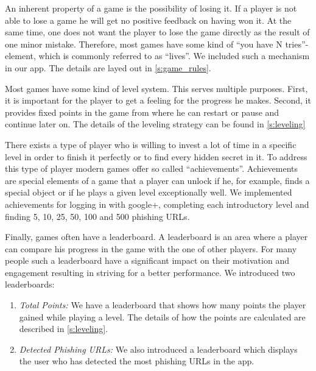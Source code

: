 \begin{description}[leftmargin=0cm]
\item[Lives:] An inherent property of a game is the possibility of losing it.
If a player is not able to lose a game he will get no positive feedback on having won it.
At the same time, one does not want the player to lose the game directly as the result of one minor mistake.
Therefore, most games have some kind of ``you have N tries''-element, which is commonly referred to as ``lives''.
We included such a mechanism in our app.
The details are layed out in \autoref{s:game_rules}.
\item[Levels:] Most games have some kind of level system.
This serves multiple purposes.
First, it is important for the player to get a feeling for the progress he makes.
Second, it provides fixed points in the game from where he can restart or pause and continue later on.
The details of the leveling strategy can be found in \autoref{s:leveling}

\item[Achievements:] There exists a type of player who is willing to invest a lot of time in a specific level in order to finish it perfectly or to find every hidden secret in it.
To address this type of player modern games offer so called ``achievements''.
Achievements are special elements of a game that a player can unlock if he, for example, finds a special object or if he plays a given level exceptionally well. 
We implemented achievements for logging in with google+, completing each introductory level and finding 5, 10, 25, 50, 100 and 500 phishing URLs. 

\item[Leaderboards:] Finally, games often have a leaderboard.
A leaderboard is an area where a player can compare his progress in the game with the one of other players.
For many people such a leaderboard have a significant impact on their motivation and engagement resulting in striving for a better performance.
We introduced two leaderboards:
\begin{enumerate}
\item \textit{Total Points:} We have a leaderboard that shows how many points the player gained while playing a level. The details of how the points are calculated are described in \autoref{s:leveling}.
\item \textit{Detected Phishing URLs:} We also introduced a leaderboard which displays the user who has detected the most phishing URLs in the app. 
\end{enumerate}

\end{description}

